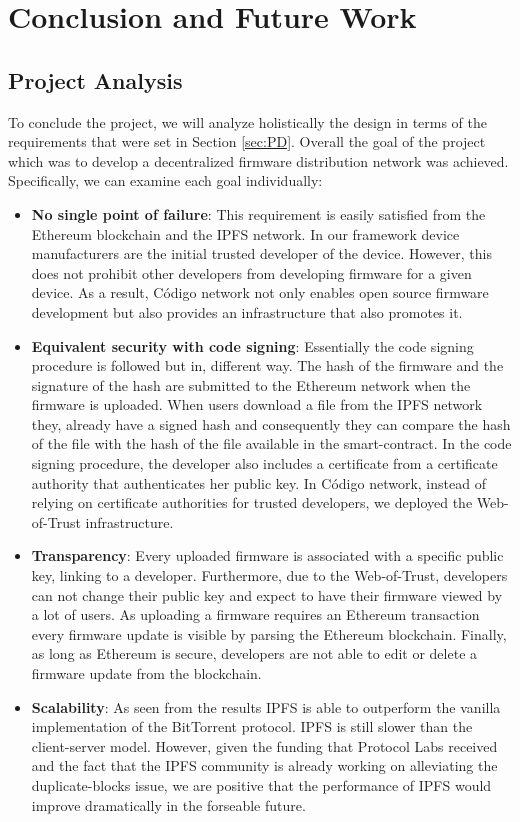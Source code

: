 
\chapter{Conclusion and Future Work} \label{chap:conc}{
\section{Project Analysis}{

To conclude the project, we will analyze holistically the design in terms of the requirements that were set in Section \ref{sec:PD}. Overall the goal of the project which was to develop a decentralized firmware distribution network was achieved. Specifically, we can examine each goal individually:
\begin{itemize}
    \item \textbf{No single point of failure}: This requirement is easily satisfied from the Ethereum blockchain and the IPFS network. In our framework device manufacturers are the initial trusted developer of the device. However, this does not prohibit other developers from developing firmware for a given device. As a result, Código network not only enables open source firmware development but also provides an infrastructure that also promotes it.
    \item \textbf{Equivalent security with code signing}: Essentially the code signing procedure is followed but in, different way. The hash of the firmware and the signature of the hash are submitted to the Ethereum network when the firmware is uploaded. When users download a file from the IPFS network they, already have a signed hash and consequently they can compare the hash of the file with the hash of the file available in the smart-contract. In the code signing procedure, the developer also includes a certificate from a certificate authority that authenticates her public key. In Código network, instead of relying on certificate authorities for trusted developers, we deployed the Web-of-Trust infrastructure.
    \item \textbf{Transparency}: Every uploaded firmware is associated with a specific public key, linking to a developer. Furthermore, due to the Web-of-Trust, developers can not change their public key and expect to have their firmware viewed by a lot of users. As uploading a firmware requires an Ethereum transaction every firmware update is visible by parsing the Ethereum blockchain. Finally, as long as Ethereum is secure, developers are not able to edit or delete a firmware update from the blockchain.
    \item \textbf{Scalability}: As seen from the results IPFS is able to outperform the vanilla implementation of the BitTorrent protocol. IPFS is still slower than the client-server model. However, given the funding that Protocol Labs received and the fact that the IPFS community is already working on alleviating the duplicate-blocks issue, we are positive that the performance of IPFS would improve dramatically in the forseable future.
\end{itemize}

}}
